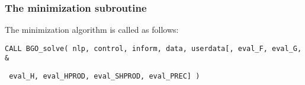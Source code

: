 \documentclass{galahad}
\newcommand{\packagename}{BGO}
\begin{document}

\subsubsection{The minimization subroutine}
The minimization algorithm is called as follows:
\vspace*{1mm}

\hspace{8mm}
{\tt CALL \packagename\_solve( nlp, control, inform, data, userdata[, eval\_F,
eval\_G, \hspace{8mm}                  \&}
\vspace*{-1mm}

\hspace{37mm}
{\tt
eval\_H,  eval\_HPROD, eval\_SHPROD, eval\_PREC] )}
\end{document}
